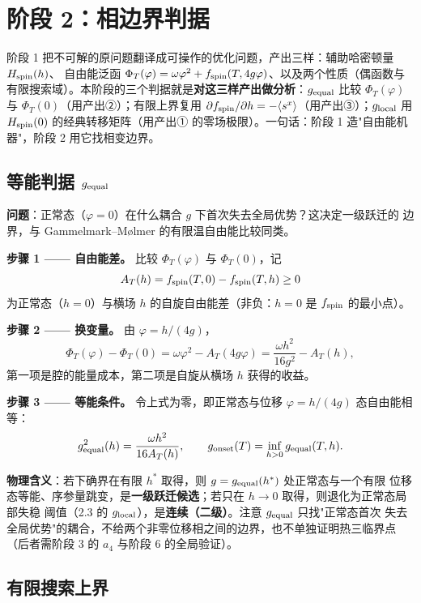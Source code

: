 \documentclass[UTF8,11pt,a4paper]{ctexart}
\begin{document}
\section{阶段 2：相边界判据}

阶段 1 把不可解的原问题翻译成可操作的优化问题，产出三样：辅助哈密顿量 $H_{\rm spin}(h)$、
自由能泛函 $\Phi_T(\varphi)=\omega\varphi^2+f_{\rm spin}(T,4g\varphi)$、以及两个性质（偶函数与
有限搜索域）。本阶段的三个判据就是\textbf{对这三样产出做分析}：$g_{\rm equal}$ 比较
$\Phi_T(\varphi)$ 与 $\Phi_T(0)$（用产出②）；有限上界复用 $\partial f_{\rm spin}/\partial h
=-\langle s^x\rangle$（用产出③）；$g_{\rm local}$ 用 $H_{\rm spin}(0)$ 的经典转移矩阵（用产出①
的零场极限）。一句话：阶段 1 造"自由能机器"，阶段 2 用它找相变边界。

\subsection{等能判据 $g_{\rm equal}$}

\textbf{问题}：正常态（$\varphi=0$）在什么耦合 $g$ 下首次失去全局优势？这决定一级跃迁的
边界，与 Gammelmark--Mølmer 的有限温自由能比较同类\cite{Gammelmark2011Thermal}。

\textbf{步骤 1 —— 自由能差。} 比较 $\Phi_T(\varphi)$ 与 $\Phi_T(0)$，记
\[
A_T(h)=f_{\rm spin}(T,0)-f_{\rm spin}(T,h)\ge0
\]
为正常态（$h=0$）与横场 $h$ 的自旋自由能差（非负：$h=0$ 是 $f_{\rm spin}$ 的最小点）。

\textbf{步骤 2 —— 换变量。} 由 $\varphi=h/(4g)$，
\[
\Phi_T(\varphi)-\Phi_T(0)=\omega\varphi^2-A_T(4g\varphi)=\frac{\omega h^2}{16g^2}-A_T(h),
\]
第一项是腔的能量成本，第二项是自旋从横场 $h$ 获得的收益。

\textbf{步骤 3 —— 等能条件。} 令上式为零，即正常态与位移 $\varphi=h/(4g)$ 态自由能相等：
\[
g_{\rm equal}^2(h)=\frac{\omega h^2}{16A_T(h)},\qquad g_{\rm onset}(T)=\inf_{h>0}g_{\rm equal}(T,h).
\]

\textbf{物理含义}：若下确界在有限 $h^\ast$ 取得，则 $g=g_{\rm equal}(h^\ast)$ 处正常态与一个有限
位移态等能、序参量跳变，是\textbf{一级跃迁候选}；若只在 $h\to0$ 取得，则退化为正常态局部失稳
阈值（2.3 的 $g_{\rm local}$），是\textbf{连续（二级）}。注意 $g_{\rm equal}$ 只找"正常态首次
失去全局优势"的耦合，不给两个非零位移相之间的边界，也不单独证明热三临界点（后者需阶段 3 的
$a_4$ 与阶段 6 的全局验证）。

\subsection{有限搜索上界}
\end{document}
